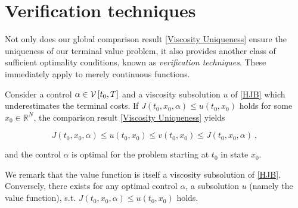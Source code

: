 \section{Verification techniques}

Not only does our global comparison result \ref{Viscosity Uniqueness} ensure the uniqueness of our terminal value problem, it also provides another class of sufficient optimality conditions, known as \emph{verification techniques}. These immediately apply to merely continuous functions.

Consider a control $ \alpha \in \mathcal{V}\left[ {t_0}, T \right] $ and a viscosity subsolution $ u $ of \eqref{HJB} which underestimates the terminal costs. If $ J(t_0, x_0, \alpha) \leq u(t_0, x_0) $ holds for some $ x_0 \in \mathbb{R}^N $, the comparison result \ref{Viscosity Uniqueness} yields

\begin{equation*}
	J(t_0, x_0, \alpha) \leq u(t_0, x_0) \leq v(t_0, x_0) \leq J(t_0, x_0, \alpha) \ ,
\end{equation*}

and the control $ \alpha $ is optimal for the problem starting at $ t_0 $ in state $ x_0 $.

We remark that the value function is itself a viscosity subsolution of \eqref{HJB}. Conversely, there exists for any optimal control $ \alpha $, a subsolution $ u $ (namely the value function), s.t. $ J(t_0, x_0, \alpha) \leq u(t_0, x_0) $ holds.